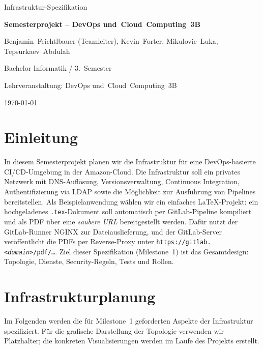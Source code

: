 \documentclass[a4paper,12pt]{article}
\begin{document}
\begin{titlepage}
  \centering
  \vspace*{2cm}
  {\Huge Infrastruktur-Spezifikation \par}
  \vspace{0.6cm}
  {\Large \textbf{Semesterprojekt – DevOps und~Cloud~Computing~3B} \par}
  \vspace{1.6cm}
  {\large Benjamin~Feichtlbauer (Teamleiter), Kevin~Forter, Mikulovic~Luka, Tepsurkaev~Abdulah\par}
  {\large Bachelor Informatik / 3.~Semester \par}
  {\large Lehrveranstaltung: DevOps und~Cloud~Computing~3B \par}
  {\large \today\par}
\end{titlepage}

\section*{Einleitung}
In diesem Semesterprojekt planen wir die Infrastruktur für eine DevOps-basierte
CI/CD-Umgebung in der Amazon-Cloud. Die Infrastruktur soll ein privates
Netzwerk mit DNS-Auflösung, Versionsverwaltung, Continuous Integration,
Authentifizierung via LDAP sowie die Möglichkeit zur Ausführung von Pipelines
bereitstellen. Als Beispielanwendung wählen wir ein einfaches \LaTeX{}-Projekt:
ein hochgeladenes \texttt{.tex}-Dokument soll automatisch per GitLab-Pipeline
kompiliert und als PDF über eine \emph{saubere URL} bereitgestellt werden.
Dafür nutzt der GitLab-Runner NGINX zur Dateiauslieferung, und der GitLab-Server
veröffentlicht die PDFs per Reverse-Proxy unter \texttt{https://gitlab.\emph{<domain>}/pdf/…}.
Ziel dieser Spezifikation (Milestone~1) ist das Gesamtdesign: Topologie,
Dienste, Security-Regeln, Tests und Rollen.

\section*{Infrastrukturplanung}

Im Folgenden werden die für Milestone~1 geforderten Aspekte der
Infrastruktur spezifiziert. Für die grafische Darstellung der Topologie
verwenden wir Platzhalter; die konkreten Visualisierungen werden
im Laufe des Projekts erstellt.
\end{document}
